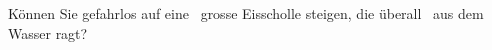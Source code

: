 Können Sie gefahrlos auf eine \AscO\ grosse Eisscholle steigen, die überall \hueO\ aus dem Wasser ragt?
